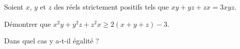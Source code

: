 \documentclass[varwidth]{standalone}
\begin{document}
    Soient $x$, $y$ et $z$ des r\'eels strictement positifs tels que $xy + yz + zx = 3xyz$.

    D\'emontrer que $x^2y + y^2z + z^2x \geq 2(x + y + z) - 3$.

    Dans quel cas y a-t-il \'egalit\'e ?
\end{document}
